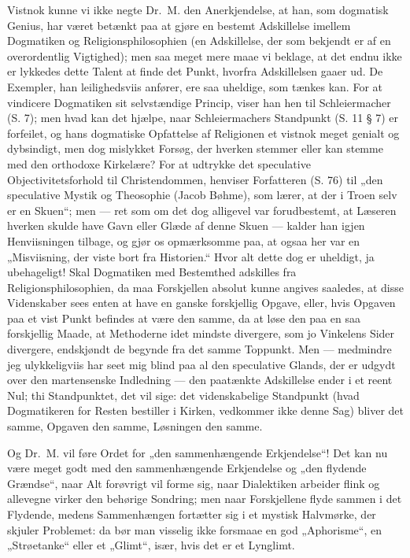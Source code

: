 Vistnok kunne vi ikke negte Dr.\ M. den Anerkjendelse, at han, som
dogmatisk Genius, har været betænkt
 paa at gjøre en bestemt Adskillelse imellem Dogmatiken og
Religionsphilosophien (en Adskillelse, der som bekjendt er af en
overordentlig Vigtighed); men saa meget mere maae vi beklage, at
det endnu ikke er lykkedes dette Talent at finde det Punkt,
hvorfra Adskillelsen gaaer ud. De Exempler, han leilighedsviis
anfører, ere saa uheldige, som tænkes kan. For at vindicere
Dogmatiken sit selvstændige Princip, viser han hen til
Schleiermacher (S. 7); men hvad kan det hjælpe, naar
Schleiermachers Standpunkt (S. 11 § 7) er forfeilet, og hans
dogmatiske Opfattelse af Religionen et vistnok meget genialt og
dybsindigt, men dog mislykket Forsøg, der hverken stemmer eller
kan stemme med den orthodoxe Kirkelære? For at udtrykke det
speculative Objectivitetsforhold til Christendommen, henviser
Forfatteren (S. 76) til „den speculative Mystik og Theosophie
(Jacob Bøhme), som lærer, at der i Troen selv er en Skuen“; men
--- ret som om det dog alligevel var forudbestemt, at Læseren
hverken skulde have Gavn eller Glæde af denne Skuen --- kalder han
igjen Henviisningen tilbage, og gjør os opmærksomme paa, at ogsaa
her var en „Misviisning, der viste bort fra Historien.“ Hvor alt
dette dog er uheldigt, ja ubehageligt! Skal Dogmatiken med
Bestemthed adskilles fra Religionsphilosophien, da maa Forskjellen
absolut kunne angives saaledes, at disse Videnskaber sees enten at
have en ganske forskjellig Opgave, eller, hvis Opgaven paa et vist
Punkt befindes at være den samme, da at løse den paa en saa
forskjellig Maade, at Methoderne idet%
mindste divergere, som jo Vinkelens Sider divergere, endskjøndt de
begynde fra det samme Toppunkt. Men --- medmindre jeg
ulykkeligviis har seet mig blind paa al den speculative Glands,
der er udgydt over den martensenske Indledning --- den paatænkte
Adskillelse ender i et reent Nul; thi Standpunktet, det vil sige:
det videnskabelige Standpunkt (hvad Dogmatikeren for Resten
bestiller i Kirken, vedkommer ikke denne Sag) bliver det samme,
Opgaven den samme, Løsningen den samme.

Og Dr.\ M. vil føre Ordet for „den sammenhængende Erkjendelse“!
Det kan nu være meget godt med den sammenhængende Erkjendelse og
„den flydende Grændse“, naar Alt forøvrigt vil forme sig, naar
Dialektiken arbeider flink og allevegne virker den behørige
Sondring; men naar Forskjellene flyde sammen i det Flydende,
medens Sammenhængen fortætter sig i et mystisk Halvmørke, der
skjuler Problemet: da bør man visselig ikke forsmaae en god
„Aphorisme“, en „Strøetanke“ eller et „Glimt“, især, hvis det er et
Lynglimt.

